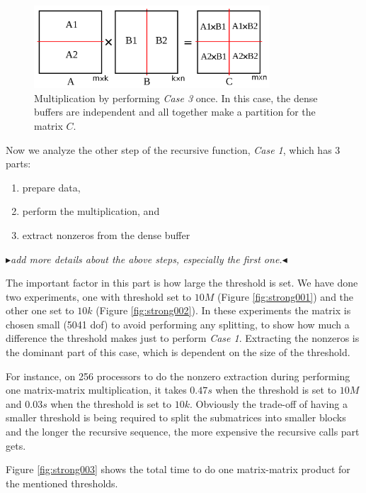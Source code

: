 \documentclass[conference,10pt]{IEEEtran}
\newcommand{\mr}[1]{\mynote{Majid}{blue}{#1}}
\newcommand{\mynote}[3]{
	\textcolor{#2}{\fbox{\bfseries\sffamily\scriptsize#1}}
		{\small$\blacktriangleright$\textsf{\emph{#3}}$\blacktriangleleft$}
}
\begin{document}
\begin{figure}[thb]
    \includegraphics[width=8.8cm,height=3.1cm]{./figures/skinny002.pdf}
    \caption{Multiplication by performing \textit{Case 3} once. In this case, the dense buffers are independent and all together make a partition for the matrix $C$.}
    \label{fig:skinny2}
\end{figure}

Now we analyze the other step of the recursive function, \textit{Case 1}, which has $3$ parts:
\begin{enumerate}
 \item prepare data,
 \item perform the multiplication, and
 \item extract nonzeros from the dense buffer
\end{enumerate}

\mr{add more details about the above steps, especially the first one.}

The important factor in this part is how large the threshold is set. We have done two experiments, one with threshold set to $10M$ (Figure \ref{fig:strong001}) and the other one set to $10k$ (Figure \ref{fig:strong002}). In these experiments the matrix is chosen small (5041 dof) to avoid performing any splitting, to show how much a difference the threshold makes just to perform \textit{Case 1}. Extracting the nonzeros is the dominant part of this case, which is dependent on the size of the threshold.

For instance, on 256 processors to do the nonzero extraction during performing one matrix-matrix multiplication, it takes $0.47s$ when the threshold is set to $10M$ and $0.03s$ when the threshold is set to $10k$. Obviously the trade-off of having a smaller threshold is being required to split the submatrices into smaller blocks and the longer the recursive sequence, the more expensive the recursive calls part gets.

Figure \ref{fig:strong003} shows the total time to do one matrix-matrix product for the mentioned thresholds.

\newpage
\end{document}
